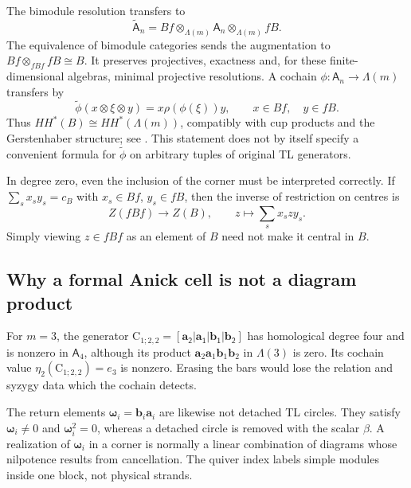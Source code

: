 \documentclass[a4paper,11pt,oneside,reqno]{amsart}
\theoremstyle{definition}
\numberwithin{equation}{section}
\begin{document}
	The bimodule resolution transfers to
	\begin{equation}\label{tl:transferred-resolution}
		\widetilde{\mathsf A}_n=Bf\otimes_{\Lambda(m)}\mathsf A_n\otimes_{\Lambda(m)}fB.
	\end{equation}
	The equivalence of bimodule categories sends the augmentation to
	$Bf\otimes_{fBf}fB\cong B$.  It preserves projectives, exactness and,
	for these finite-dimensional algebras, minimal projective resolutions.
	A cochain $\phi:\mathsf A_n\to\Lambda(m)$ transfers by
	\begin{equation}\label{tl:transfer-cochain}
		\widetilde\phi(x\otimes\xi\otimes y)=x\rho(\phi(\xi))y,
		\qquad x\in Bf,\quad y\in fB.
	\end{equation}
	Thus $HH^*(B)\cong HH^*(\Lambda(m))$, compatibly with cup products
	and the Gerstenhaber structure; see \cite{Keller,Transfer}.
	This statement does not by itself specify a convenient formula for
	$\widetilde\phi$ on arbitrary tuples of original TL generators.
	
	In degree zero, even the inclusion of the corner must be interpreted
	correctly.  If $\sum_s x_sy_s=c_B$ with $x_s\in Bf$, $y_s\in fB$,
	then the inverse of restriction on centres is
	\begin{equation}\label{tl:center-transfer}
		Z(fBf)\longrightarrow Z(B),\qquad z\longmapsto\sum_s x_szy_s.
	\end{equation}
	Simply viewing $z\in fBf$ as an element of $B$ need not make it
	central in $B$.
	
	\subsection{Why a formal Anick cell is not a diagram product}
	For $m=3$, the generator $\mathrm C_{1;2,2}=\mathsf{[\mathbf{a}_2|\mathbf{a}_1|\mathbf{b}_1|\mathbf{b}_2]}$ has
	homological degree four and is nonzero in $\mathsf A_4$, although its product
	$\mathbf{a}_2\mathbf{a}_1\mathbf{b}_1\mathbf{b}_2$ in $\Lambda(3)$ is zero.  Its cochain value
	$\eta_2(\mathrm C_{1;2,2})=e_3$ is nonzero.  Erasing the bars would lose the
	relation and syzygy data which the cochain detects.
	
	The return elements $\boldsymbol{\omega}_i=\mathbf{b}_i\mathbf{a}_i$ are likewise not detached TL
	circles.  They satisfy $\boldsymbol{\omega}_i\ne0$ and $\boldsymbol{\omega}_i^2=0$, whereas a detached
	circle is removed with the scalar $\beta$.  A realization of $\boldsymbol{\omega}_i$
	in a corner is normally a linear combination of diagrams whose
	nilpotence results from cancellation.  The quiver index labels
	simple modules inside one block, not physical strands.
	
\end{document}
